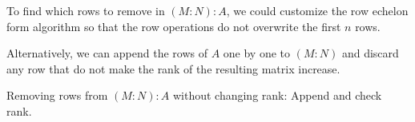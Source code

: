 \documentclass[11pt, oneside, a4paper]{article}
\begin{document}
To find which rows to remove in $(M:N):A$, we could customize the row echelon form algorithm so that the row operations do not overwrite the first $n$ rows.



Alternatively, we can append the rows of $A$ one by one to $(M:N)$ and discard any row that do not make the rank of the resulting matrix increase.

\begin{algorithm}[H]
    \caption{Removing rows from $(M:N):A$ without changing rank: Append and check rank.}\label{algo:removing rows from (M:N):A without changing rank by checking rank: apppend and check rank.}
\end{algorithm}
\end{document}
